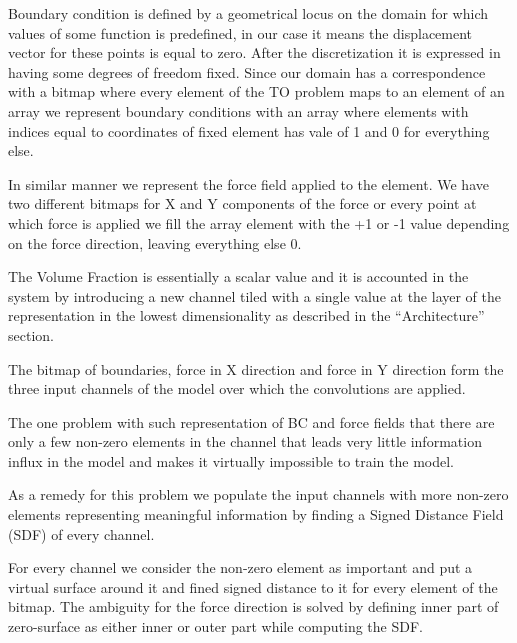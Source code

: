 Boundary condition is defined by a geometrical locus on the domain for which values of some function is predefined, in our case it means the displacement vector for these points is equal to zero. 
After the discretization it is expressed in having some degrees of freedom fixed. 
Since our domain has a correspondence with a bitmap where every element of the TO problem maps to an element of an array we represent boundary conditions with an array where elements with indices equal to coordinates of fixed element has vale of {1} and {0} for everything else.
\medskip

In similar manner we represent the force field applied to the element.
We have two different bitmaps for {X} and {Y} components of the force or every point at which force is applied we fill the array element with the {+1} or {-1} value depending on the force direction, leaving everything else {0}.
\medskip

The Volume Fraction is essentially a scalar value and it is accounted in the system by introducing a new channel tiled with a single value at the layer of the representation in the lowest dimensionality as described in the ``Architecture'' section.
\medskip

The bitmap of boundaries, force in X direction and force in Y direction form the three input channels of the model over which the convolutions are applied.
\medskip

The one problem with such representation of BC and force fields that there are only a few non-zero elements in the channel that leads very little information influx in the model and makes it virtually impossible to train the model.
\medskip

As a remedy for this problem we populate the input channels with more non-zero elements representing meaningful information by finding a Signed Distance Field (SDF) of every channel.
\medskip

For every channel we consider the non-zero element as important and put a virtual surface around it and fined signed distance to it for every element of the bitmap.
The ambiguity for the force direction is solved by defining inner part of zero-surface as either inner or outer part while computing the SDF.

